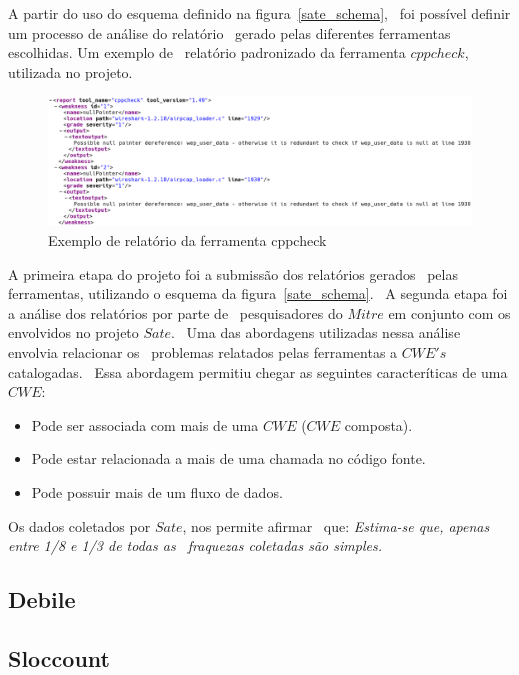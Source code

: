 A partir do uso do esquema definido na figura~\ref{sate_schema}, \ 
foi possível definir um processo de análise do relatório \
gerado pelas diferentes ferramentas escolhidas. Um exemplo de \ 
relatório padronizado da ferramenta $cppcheck$, utilizada no projeto.

\begin{figure}[h]
	\centering
	\label{cppcheck}
        \includegraphics[scale=0.42]{figuras/cppcheck.eps}
	\caption{Exemplo de relatório da ferramenta cppcheck}
\end{figure}
\newpage

A primeira etapa do projeto foi a submissão dos relatórios gerados \ 
pelas ferramentas, utilizando o esquema da figura~\ref{sate_schema}. \ 
A segunda etapa foi a análise dos relatórios por parte de \ 
pesquisadores do $Mitre$ em conjunto com os envolvidos no projeto $Sate$. \ 
Uma das abordagens utilizadas nessa análise envolvia relacionar os \ 
problemas relatados pelas ferramentas a $CWE's$ catalogadas. \ 
Essa abordagem permitiu chegar as seguintes caracteríticas de uma $CWE$:

\begin{itemize}
        \item Pode ser associada com mais de uma $CWE$ ($CWE$ composta).
        \item Pode estar relacionada a mais de uma chamada no código fonte.
        \item Pode possuir mais de um fluxo de dados.
\end{itemize}

Os dados coletados por $Sate$, nos permite afirmar \ 
que: \emph{Estima-se que, apenas entre 1/8 e 1/3  de todas as \ 
fraquezas coletadas são simples.}

\subsection{Debile}

\subsection{Sloccount}


